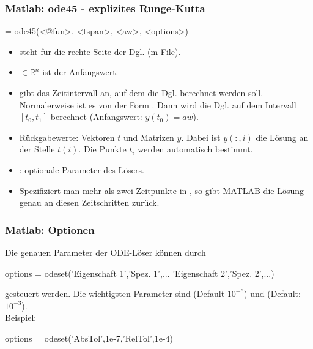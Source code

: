 \documentclass[hyperref={xetex}]{beamer}
\begin{document}
%
%
\begin{frame}[fragile]\frametitle{Matlab: ode45 - explizites Runge-Kutta} 
\begin{matlabin}
[<t>,<y>] = ode45(<@fun>, <tspan>, <aw>, <options>)
\end{matlabin}
\begin{itemize}
\item {} steht f\"ur die rechte Seite der Dgl. (m-File).
\item {} $\in \mathbb{R}^n$ ist der Anfangswert.
\item {} gibt das Zeitintervall an, auf dem die Dgl. berechnet
  werden soll. Normalerweise ist es von der Form
  . Dann wird die Dgl. auf dem Intervall $[t_0,
  t_1]$ berechnet (Anfangswert: $y(t_0)=aw$).
\item Rückgabewerte: Vektoren $t$ und Matrizen $y$. Dabei ist
  $y(:,i)$ die L\"osung an der Stelle $t(i)$. Die Punkte $t_i$ werden
  automatisch bestimmt.
\item {}: optionale Parameter des L\"osers. 
\item Spezifiziert man mehr als zwei Zeitpunkte in , so gibt MATLAB die
  L\"osung genau an diesen Zeitschritten zur\"uck.
\end{itemize}
\end{frame}
%
%
\begin{frame}[fragile]\frametitle{Matlab: Optionen}
Die genauen Parameter der ODE-L\"oser k\"onnen durch\\

\begin{matlabin}
options = odeset('Eigenschaft 1','Spez. 1',...
  'Eigenschaft 2','Spez. 2',...) 
\end{matlabin}

gesteuert werden. Die wichtigsten Parameter sind 
(Default $10^{-6}$) und  (Default: $10^{-3}$). \\[0.5cm]
\alert{Beispiel:}
\begin{matlabin}
options = odeset('AbsTol',1e-7,'RelTol',1e-4)
\end{matlabin}
\end{frame}
%
%
\end{document}
